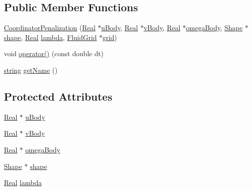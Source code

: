 \subsection*{Public Member Functions}
\begin{DoxyCompactItemize}
\item 
\hyperlink{class_coordinator_penalization_a6f84806707709981c60711eb56f9cac2}{Coordinator\+Penalization} (\hyperlink{_h_d_f5_dumper_8h_a445a5f0e2a34c9d97d69a3c2d1957907}{Real} $\ast$\hyperlink{class_coordinator_penalization_a69c4aa62739ebf73ddba8c688c4212d7}{u\+Body}, \hyperlink{_h_d_f5_dumper_8h_a445a5f0e2a34c9d97d69a3c2d1957907}{Real} $\ast$\hyperlink{class_coordinator_penalization_a0e387ed3e8f65a876de9e44dcd866c58}{v\+Body}, \hyperlink{_h_d_f5_dumper_8h_a445a5f0e2a34c9d97d69a3c2d1957907}{Real} $\ast$\hyperlink{class_coordinator_penalization_af18f7de3308e47cdd39a367f843276f0}{omega\+Body}, \hyperlink{class_shape}{Shape} $\ast$\hyperlink{class_coordinator_penalization_a1d686d4837782669fe4048d8247694e4}{shape}, \hyperlink{_h_d_f5_dumper_8h_a445a5f0e2a34c9d97d69a3c2d1957907}{Real} \hyperlink{class_coordinator_penalization_a1fb2d57c01272130fcc1db62b6e61db3}{lambda}, \hyperlink{_definitions_8h_aff3288a3741f5098bcc456bb13440189}{Fluid\+Grid} $\ast$\hyperlink{class_generic_coordinator_aa514bbf7394bb5519c6f12daa33a375a}{grid})
\item 
void \hyperlink{class_coordinator_penalization_ac6138327b1de95c0cf53d0ed47872292}{operator()} (const double dt)
\item 
\hyperlink{testfpzip_8cpp_a984bb8e04129c4268bd6ff36a50c9fa4}{string} \hyperlink{class_coordinator_penalization_ae53f97c939755a01f3eba9c20a78f2e4}{get\+Name} ()
\end{DoxyCompactItemize}
\subsection*{Protected Attributes}
\begin{DoxyCompactItemize}
\item 
\hyperlink{_h_d_f5_dumper_8h_a445a5f0e2a34c9d97d69a3c2d1957907}{Real} $\ast$ \hyperlink{class_coordinator_penalization_a69c4aa62739ebf73ddba8c688c4212d7}{u\+Body}
\item 
\hyperlink{_h_d_f5_dumper_8h_a445a5f0e2a34c9d97d69a3c2d1957907}{Real} $\ast$ \hyperlink{class_coordinator_penalization_a0e387ed3e8f65a876de9e44dcd866c58}{v\+Body}
\item 
\hyperlink{_h_d_f5_dumper_8h_a445a5f0e2a34c9d97d69a3c2d1957907}{Real} $\ast$ \hyperlink{class_coordinator_penalization_af18f7de3308e47cdd39a367f843276f0}{omega\+Body}
\item 
\hyperlink{class_shape}{Shape} $\ast$ \hyperlink{class_coordinator_penalization_a1d686d4837782669fe4048d8247694e4}{shape}
\item 
\hyperlink{_h_d_f5_dumper_8h_a445a5f0e2a34c9d97d69a3c2d1957907}{Real} \hyperlink{class_coordinator_penalization_a1fb2d57c01272130fcc1db62b6e61db3}{lambda}
\end{DoxyCompactItemize}
